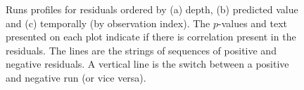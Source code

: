 \begin{frame}[fragile]
\begin{figure}[h!]
  \centering
  \hfill
  \hfill
  \hfill
\caption{Runs profiles for residuals ordered by (a) depth, (b) predicted value and (c) temporally (by observation index). The $p$-values and text presented on each plot indicate if there is correlation present in the residuals.  The lines are the strings of sequences of positive and negative residuals.  A vertical line is the switch between a positive and negative run (or vice versa).}
\label{fig:runs1}
\end{figure}
\end{frame}


